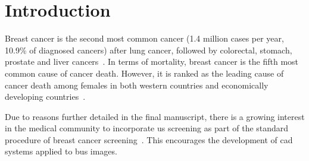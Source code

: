 \graphicspath{ {./content/intro/figures/} }

\section{Introduction}
\label{sec:intro}  %


Breast cancer is the second most common cancer (1.4 million cases per year, 10.9\% of  diagnosed cancers) after lung cancer, followed by colorectal, stomach, prostate and liver cancers~\cite{Ferlay2010}.
In terms of mortality, breast cancer is the fifth most common cause of cancer death.
However, it is ranked as the leading cause of cancer death among females in both western countries and economically developing countries~\cite{cancerStatistics2011}.



Due to reasons further detailed in the final manuscript, there is a growing interest in the medical community to incorporate \ac{us} screening as part of the standard procedure of breast cancer screening~\cite{biradsus}. This encourages the development of \ac{cad} systems applied to \ac{bus} images.

